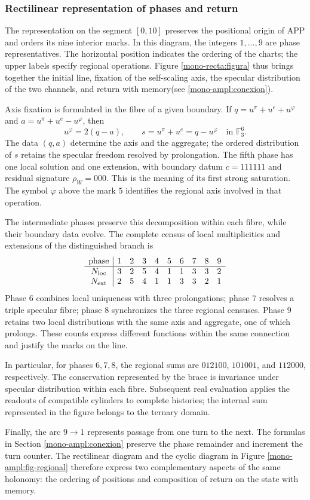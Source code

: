 \subsubsection{Rectilinear representation of phases and return}
\label{mono-recta:desarrollo}

The representation on the segment \([0,10]\) preserves the positional
origin of APP and orders its nine interior marks. In this diagram,
the integers \(1,\ldots,9\) are phase representatives. The horizontal
position indicates the ordering of the charts; the upper labels
specify regional operations. Figure
\ref{mono-recta:figura} thus brings together the initial line, fixation of the
self-scaling axis, the specular distribution of the two channels, and
return with memory(see \ref{mono-ampl:conexion}).



Axis fixation is formulated in the fibre of a given boundary. If
\(q=u^\pi+u^e+u^\varphi\) and
\(a=u^\pi+u^e-u^\varphi\), then
\[
 u^\varphi=2(q-a),\qquad s=u^\pi+u^e=q-u^\varphi
 \quad\text{in }\mathbb F_3^6.
\]
The data \((q,a)\) determine the axis and the aggregate; the ordered distribution
of \(s\) retains the specular freedom resolved by prolongation.
The fifth phase has one local solution and one extension, with boundary
datum \(c=111111\) and residual signature \(\rho_W=000\). This is the
meaning of its first strong saturation. The symbol \(\varphi\)
above the mark \(5\) identifies the regional axis involved
in that operation.

The intermediate phases preserve this decomposition within each fibre,
while their boundary data evolve. The complete census of
local multiplicities and extensions of the distinguished branch is
\[
\begin{array}{c|rrrrrrrrr}
\text{phase}&1&2&3&4&5&6&7&8&9\\\hline
N_{\rm loc}&3&2&5&4&1&1&3&3&2\\
N_{\rm ext}&2&5&4&1&1&3&3&2&1
\end{array}
\]
Phase \(6\) combines local uniqueness with three prolongations; phase
\(7\) resolves a triple specular fibre; phase \(8\) synchronizes
the three regional censuses. Phase \(9\) retains two local
distributions with the same axis and aggregate, one of which
prolongs. These counts express different functions within the
same connection and justify the marks on the line.

In particular, for phases \(6,7,8\), the regional sums are
\(012100\), \(101001\), and \(112000\), respectively. The conservation
represented by the brace is invariance under specular distribution
within each fibre. Subsequent real evaluation applies the
readouts of compatible cylinders to complete histories; the
internal sum represented in the figure belongs to the ternary domain.

Finally, the arc \(9\to1\) represents passage from one turn to the
next. The formulas in Section
\ref{mono-ampl:conexion} preserve the phase remainder and increment the
turn counter. The rectilinear diagram and the cyclic diagram in
Figure \ref{mono-ampl:fig-regional} therefore express two complementary
aspects of the same holonomy: the ordering of positions and
composition of return on the state with memory.
